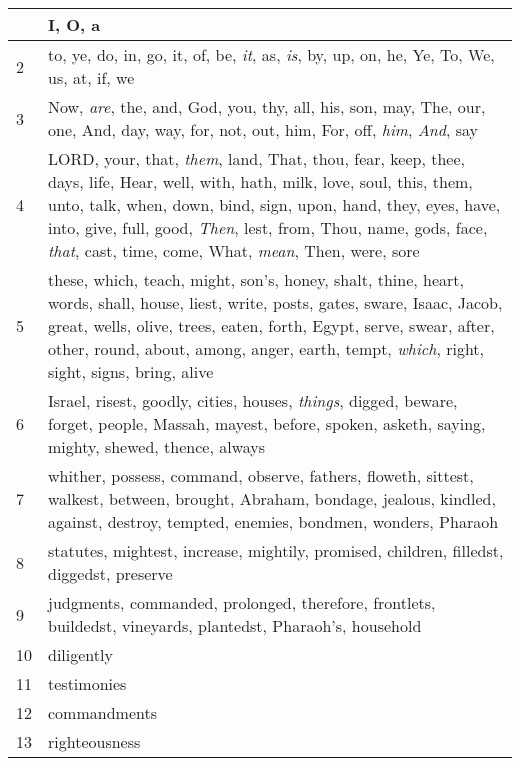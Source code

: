 \begin{longtable}{l|p{3.75in}}
\hline \hline
\endlastfoot
1 & I, O, a \\ \hline
2 & to, ye, do, in, go, it, of, be, \emph{it}, as, \emph{is}, by, up, on, he, Ye, To, We, us, at, if, we \\ \hline
3 & Now, \emph{are}, the, and, God, you, thy, all, his, son, may, The, our, one, And, day, way, for, not, out, him, For, off, \emph{him}, \emph{And}, say \\ \hline
4 & LORD, your, that, \emph{them}, land, That, thou, fear, keep, thee, days, life, Hear, well, with, hath, milk, love, soul, this, them, unto, talk, when, down, bind, sign, upon, hand, they, eyes, have, into, give, full, good, \emph{Then}, lest, from, Thou, name, gods, face, \emph{that}, cast, time, come, What, \emph{mean}, Then, were, sore \\ \hline
5 & these, which, teach, might, son's, honey, shalt, thine, heart, words, shall, house, liest, write, posts, gates, sware, Isaac, Jacob, great, wells, olive, trees, eaten, forth, Egypt, serve, swear, after, other, round, about, among, anger, earth, tempt, \emph{which}, right, sight, signs, bring, alive \\ \hline
6 & Israel, risest, goodly, cities, houses, \emph{things}, digged, beware, forget, people, Massah, mayest, before, spoken, asketh, saying, mighty, shewed, thence, always \\ \hline
7 & whither, possess, command, observe, fathers, floweth, sittest, walkest, between, brought, Abraham, bondage, jealous, kindled, against, destroy, tempted, enemies, bondmen, wonders, Pharaoh \\ \hline
8 & statutes, mightest, increase, mightily, promised, children, filledst, diggedst, preserve \\ \hline
9 & judgments, commanded, prolonged, therefore, frontlets, buildedst, vineyards, plantedst, Pharaoh's, household \\ \hline
10 & diligently \\ \hline
11 & testimonies \\ \hline
12 & commandments \\ \hline
13 & righteousness \\ \hline
\end{longtable}






 



